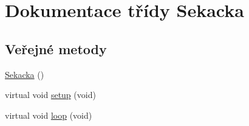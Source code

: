 \hypertarget{class_sekacka}{}\section{Dokumentace třídy Sekacka}
\label{class_sekacka}
\subsection*{Veřejné metody}
\begin{DoxyCompactItemize}
\item 
\hyperlink{class_sekacka_ab5821740b364c9fc32887f0fbef5d3ae}{Sekacka} ()
\item 
virtual void \hyperlink{class_sekacka_a2e38c70d8fdd55e112e42b4aa4afc14f}{setup} (void)
\item 
virtual void \hyperlink{class_sekacka_afd84d6e1644824b8cf317ea0514e8176}{loop} (void)
\end{DoxyCompactItemize}
